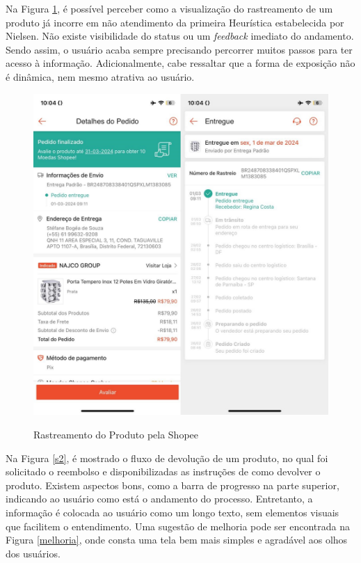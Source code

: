 Na Figura \ref{s1}, é possível perceber como a visualização do rastreamento de um produto já incorre em não atendimento da primeira Heurística estabelecida por Nielsen. Não existe visibilidade do status ou um \textit{feedback} imediato do andamento. Sendo assim, o usuário acaba sempre precisando percorrer muitos passos para ter acesso à informação. Adicionalmente, cabe ressaltar que a forma de exposição não é dinâmica, nem mesmo atrativa ao usuário.

\begin{figure}[ht]
    \centering
    \caption{Rastreamento do Produto pela Shopee}
    \includegraphics[keepaspectratio=true,scale=0.3]{figuras/shopeeRas.jpg}
    \label{s1}
\end{figure}

Na Figura \ref{s2}, é mostrado o fluxo de devolução de um produto, no qual foi solicitado o reembolso e disponibilizadas as instruções de como devolver o produto. Existem aspectos bons, como a barra de progresso na parte superior, indicando ao usuário como está o andamento do processo. Entretanto, a informação é colocada ao usuário como um longo texto, sem elementos visuais que facilitem o entendimento. Uma sugestão de melhoria pode ser encontrada na Figura \ref{melhoria}, onde consta uma tela bem mais simples e agradável aos olhos dos usuários.

